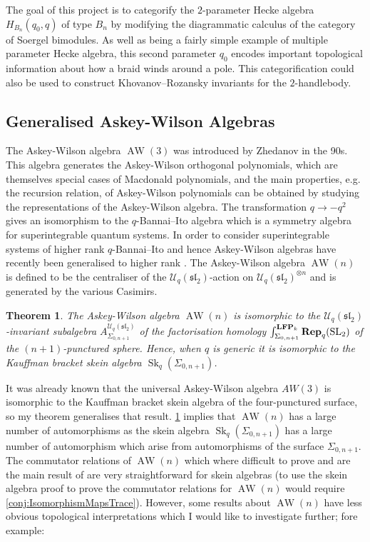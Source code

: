 \documentclass{article}
\newcommand{\catname}[1]{{\normalfont\textbf{#1}}}
\newcommand{\LFP}{\catname{LFP}}
\newcommand{\Rep}{\catname{Rep}}
\newcommand{\Sk}{\operatorname{Sk}}
\newcommand{\AW}{\operatorname{AW}}
\newcommand{\SL}{\operatorname{SL}}
\newcommand{\slgroup}{\mathfrak{sl}}
\newtheorem{thm}{Theorem}
\begin{document}
The goal of this project is to categorify the $2$-parameter Hecke algebra $H_{B_n}(q_0,q)$ of type $B_n$ by modifying the diagrammatic calculus of the category of Soergel bimodules. As well as being a fairly simple example of multiple parameter Hecke algebra, this second parameter $q_0$ encodes important topological information about how a braid winds around a pole. This categorification could also be used to construct Khovanov--Rozansky invariants for the $2$-handlebody. 

\subsection{Generalised Askey-Wilson Algebras}
\label{sec:AW}

The Askey-Wilson algebra $\AW(3)$ was introduced by Zhedanov in the 90s. This algebra generates the Askey-Wilson orthogonal polynomials, which are themselves special cases of Macdonald polynomials, and the main properties, e.g. the recursion relation, of Askey-Wilson polynomials can be obtained by studying the representations of the Askey-Wilson algebra.
The transformation $q \to -q^2$ gives an isomorphism to the $q$-Bannai--Ito algebra which is a symmetry algebra for superintegrable quantum systems. In order to consider superintegrable systems of higher rank $q$-Bannai--Ito and hence Askey-Wilson algebras have recently been generalised to higher rank \cite{PostWalter}. The Askey-Wilson algebra $\AW(n)$ is defined to be the centraliser of the $\mathcal{U}_q(\slgroup_2)$-action on $\mathcal{U}_q(\slgroup_2)^{\otimes n}$ and is generated by the various Casimirs. 

\begin{thm}
\label{thm:awalgebras}
The Askey-Wilson algebra $\AW(n)$ is isomorphic to the $\mathcal{U}_q(\slgroup_2)$-invariant subalgebra $A_{\Sigma_{0,n+1}}^{\mathcal{U}_q(\slgroup_2)}$  of the factorisation homology $\int^{\LFP_k}_{\Sigma_{0, n+1}} \Rep_{q}(\SL_2)$ of the $(n+1)$-punctured sphere. Hence, when $q$ is generic it is isomorphic to the Kauffman bracket skein algebra $\Sk_q(\Sigma_{0, n+1})$. 
\end{thm}

It was already known that the universal Askey-Wilson algebra $AW(3)$ is isomorphic to the Kauffman bracket skein algebra of the four-punctured surface, so my theorem generalises that result. 
\cref{thm:awalgebras} implies that $\AW(n)$ has a large number of automorphisms as the skein algebra $\Sk_q(\Sigma_{0,n+1})$ has a large number of automorphism which arise from automorphisms of the surface $\Sigma_{0,n+1}$. The commutator relations of $\AW(n)$ which where difficult to prove and are the main result of \cite{DeClercqHadweijch19} are very straightforward for skein algebras (to use the skein algebra proof to prove the commutator relations for $\AW(n)$ would require \cref{conj:IsomorphismMapsTrace}). However, some results about $\AW(n)$ have less obvious topological interpretations which I would like to investigate further; fore example:
\end{document}
